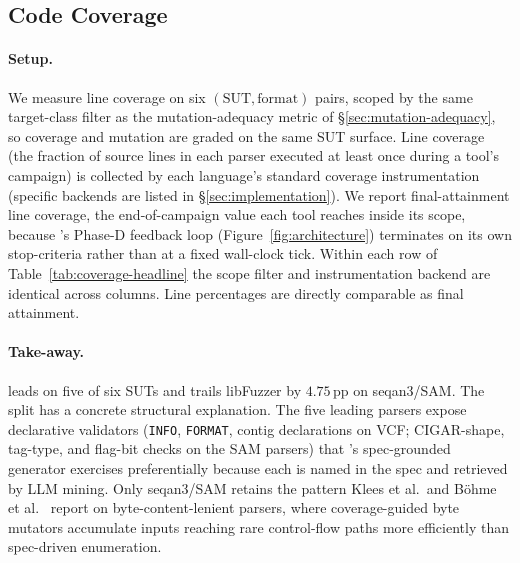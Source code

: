 
\subsection{Code Coverage}
\label{sec:coverage}



\paragraph{Setup.}
We measure line coverage on six $(\mathrm{SUT, format})$ pairs,
scoped by the same target-class filter as the
mutation-adequacy metric of \S\ref{sec:mutation-adequacy}, so
coverage and mutation are graded on the same SUT surface. Line coverage (the fraction of source
lines in each parser executed at least once during a tool's
campaign) is collected by each language's standard coverage
instrumentation (specific backends are listed in
\S\ref{sec:implementation}). We report final-attainment line
coverage, the end-of-campaign value each tool reaches inside its
scope, because \biotest's Phase-D feedback loop
(Figure~\ref{fig:architecture}) terminates on its own stop-criteria
rather than at a fixed wall-clock tick. Within each row of
Table~\ref{tab:coverage-headline} the scope filter and
instrumentation backend are identical across columns. Line
percentages are directly comparable as final attainment.

\paragraph{Take-away.}
\biotest{} leads on five of six SUTs and trails libFuzzer by
$4.75$\,pp on seqan3/SAM. The split has a concrete structural
explanation. The five leading parsers expose declarative
validators (\texttt{INFO}, \texttt{FORMAT}, contig declarations
on VCF; CIGAR-shape, tag-type, and flag-bit checks on the SAM
parsers) that \biotest{}'s spec-grounded generator exercises
preferentially because each is named in the spec and retrieved
by LLM mining. Only seqan3/SAM retains the pattern Klees et al.\
and B\"ohme et al.~\cite{klees2018fuzz,boehme2020boosting}
report on byte-content-lenient parsers, where coverage-guided
byte mutators accumulate inputs reaching rare control-flow paths
more efficiently than spec-driven enumeration.
